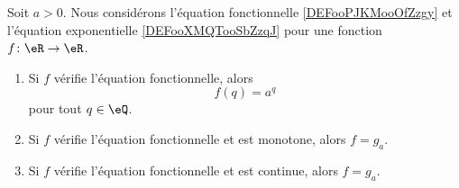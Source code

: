 \begin{proposition}    \label{PROPooGBUPooWtWaFI}
    Soit \( a>0\). Nous considérons l'équation fonctionnelle \ref{DEFooPJKMooOfZzgy} et l'équation exponentielle \ref{DEFooXMQTooSbZzqJ} pour une fonction \( f\colon \eR\to \eR\).
    \begin{enumerate}
        \item       \label{ITEMooYHAVooWzJqBj}
            Si \( f\) vérifie l'équation fonctionnelle, alors
            \begin{equation}
                f(q)=a^q
            \end{equation}
            pour tout \( q\in \eQ\).
        \item       \label{ITEMooQHOMooNVzSxn}
            Si \( f\) vérifie l'équation fonctionnelle et est monotone, alors \( f=g_a\).
        \item       \label{ITEMooCNXOooZcrxeB}
            Si \( f\) vérifie l'équation fonctionnelle et est continue, alors \( f=g_a\).
    \end{enumerate}
\end{proposition}

